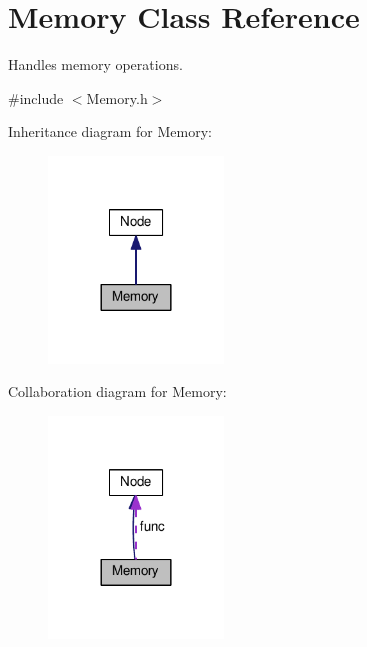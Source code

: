 \hypertarget{classMemory}{}\section{Memory Class Reference}
\label{classMemory}


Handles memory operations.  




{\ttfamily \#include $<$Memory.\+h$>$}



Inheritance diagram for Memory\+:
\nopagebreak
\begin{figure}[H]
\begin{center}
\leavevmode
\includegraphics[width=132pt]{classMemory__inherit__graph}
\end{center}
\end{figure}


Collaboration diagram for Memory\+:
\nopagebreak
\begin{figure}[H]
\begin{center}
\leavevmode
\includegraphics[width=132pt]{classMemory__coll__graph}
\end{center}
\end{figure}
